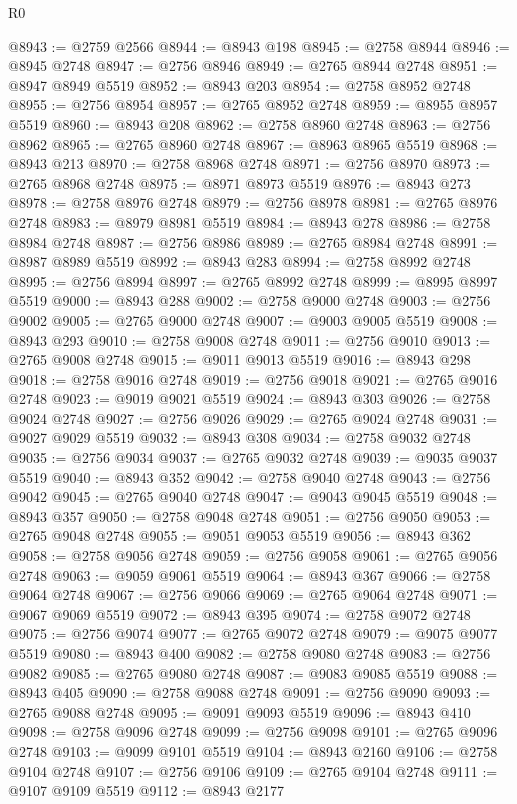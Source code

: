 \begin{lexlean}{R0}
\begin{coremodule}
@8943 := @2759 @2566
@8944 := @8943 @198
@8945 := @2758 @8944
@8946 := @8945 @2748
@8947 := @2756 @8946
@8949 := @2765 @8944 @2748
@8951 := @8947 @8949 @5519
@8952 := @8943 @203
@8954 := @2758 @8952 @2748
@8955 := @2756 @8954
@8957 := @2765 @8952 @2748
@8959 := @8955 @8957 @5519
@8960 := @8943 @208
@8962 := @2758 @8960 @2748
@8963 := @2756 @8962
@8965 := @2765 @8960 @2748
@8967 := @8963 @8965 @5519
@8968 := @8943 @213
@8970 := @2758 @8968 @2748
@8971 := @2756 @8970
@8973 := @2765 @8968 @2748
@8975 := @8971 @8973 @5519
@8976 := @8943 @273
@8978 := @2758 @8976 @2748
@8979 := @2756 @8978
@8981 := @2765 @8976 @2748
@8983 := @8979 @8981 @5519
@8984 := @8943 @278
@8986 := @2758 @8984 @2748
@8987 := @2756 @8986
@8989 := @2765 @8984 @2748
@8991 := @8987 @8989 @5519
@8992 := @8943 @283
@8994 := @2758 @8992 @2748
@8995 := @2756 @8994
@8997 := @2765 @8992 @2748
@8999 := @8995 @8997 @5519
@9000 := @8943 @288
@9002 := @2758 @9000 @2748
@9003 := @2756 @9002
@9005 := @2765 @9000 @2748
@9007 := @9003 @9005 @5519
@9008 := @8943 @293
@9010 := @2758 @9008 @2748
@9011 := @2756 @9010
@9013 := @2765 @9008 @2748
@9015 := @9011 @9013 @5519
@9016 := @8943 @298
@9018 := @2758 @9016 @2748
@9019 := @2756 @9018
@9021 := @2765 @9016 @2748
@9023 := @9019 @9021 @5519
@9024 := @8943 @303
@9026 := @2758 @9024 @2748
@9027 := @2756 @9026
@9029 := @2765 @9024 @2748
@9031 := @9027 @9029 @5519
@9032 := @8943 @308
@9034 := @2758 @9032 @2748
@9035 := @2756 @9034
@9037 := @2765 @9032 @2748
@9039 := @9035 @9037 @5519
@9040 := @8943 @352
@9042 := @2758 @9040 @2748
@9043 := @2756 @9042
@9045 := @2765 @9040 @2748
@9047 := @9043 @9045 @5519
@9048 := @8943 @357
@9050 := @2758 @9048 @2748
@9051 := @2756 @9050
@9053 := @2765 @9048 @2748
@9055 := @9051 @9053 @5519
@9056 := @8943 @362
@9058 := @2758 @9056 @2748
@9059 := @2756 @9058
@9061 := @2765 @9056 @2748
@9063 := @9059 @9061 @5519
@9064 := @8943 @367
@9066 := @2758 @9064 @2748
@9067 := @2756 @9066
@9069 := @2765 @9064 @2748
@9071 := @9067 @9069 @5519
@9072 := @8943 @395
@9074 := @2758 @9072 @2748
@9075 := @2756 @9074
@9077 := @2765 @9072 @2748
@9079 := @9075 @9077 @5519
@9080 := @8943 @400
@9082 := @2758 @9080 @2748
@9083 := @2756 @9082
@9085 := @2765 @9080 @2748
@9087 := @9083 @9085 @5519
@9088 := @8943 @405
@9090 := @2758 @9088 @2748
@9091 := @2756 @9090
@9093 := @2765 @9088 @2748
@9095 := @9091 @9093 @5519
@9096 := @8943 @410
@9098 := @2758 @9096 @2748
@9099 := @2756 @9098
@9101 := @2765 @9096 @2748
@9103 := @9099 @9101 @5519
@9104 := @8943 @2160
@9106 := @2758 @9104 @2748
@9107 := @2756 @9106
@9109 := @2765 @9104 @2748
@9111 := @9107 @9109 @5519
@9112 := @8943 @2177

\end{coremodule}
\end{lexlean}
